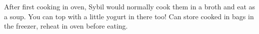 After first cooking in oven, Sybil would normally cook them in a broth and eat as a soup. You can top with a little yogurt in there too!
Can store cooked in bags in the freezer, reheat in oven before eating.

